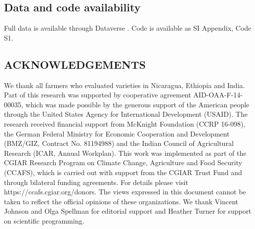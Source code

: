 \documentclass[9pt,twocolumn,twoside]{pnas-new}
\begin{document}
{\subsection*{Data and code availability} Full data is available through Dataverse \cite{vanettenreplic}. Code is available as SI Appendix, Code S1.

\subsection*{ACKNOWLEDGEMENTS}
We thank all farmers who evaluated varieties in Nicaragua, Ethiopia and India. Part of this research was supported by cooperative agreement AID-OAA-F-14-00035, which was made possible by the generous support of the American people through the United States Agency for International Development (USAID). The research received financial support from McKnight Foundation (CCRP 16-098), the German Federal Ministry for Economic Cooperation and Development (BMZ/GIZ, Contract No. 81194988) and the Indian Council of Agricultural Research (ICAR, Annual Workplan). This work was implemented as part of the CGIAR Research Program on Climate Change, Agriculture and Food Security (CCAFS), which is carried out with support from the CGIAR Trust Fund and through bilateral funding agreements. For details please visit https://ccafs.cgiar.org/donors. The views expressed in this document cannot be taken to reflect the official opinions of these organizations. We thank Vincent Johnson and Olga Spellman for editorial support and Heather Turner for support on scientific programming.
}
\showmatmethods{}
\pnasbreak


\end{document}
